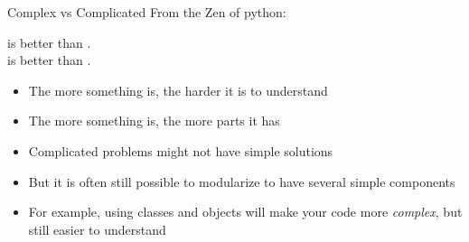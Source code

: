 \begin{frame}{Complex vs Complicated}
	From the Zen of python:

	\bigskip
	\begin{center}
		 is better than .\\
		 is better than .
	\end{center}
	\bigskip

	\begin{itemize}
		\item The more  something is, the harder it is to understand
		\item The more  something is, the more parts it has
	\end{itemize}

	\bigskip
	\begin{itemize}
		\item Complicated problems might not have simple solutions
		\item But it is often still possible to modularize to have several simple components
	\end{itemize}

	\bigskip
	\begin{itemize}
		\item For example, using classes and objects will make your code more \emph{complex}, but still easier to understand
	\end{itemize}
\end{frame}




